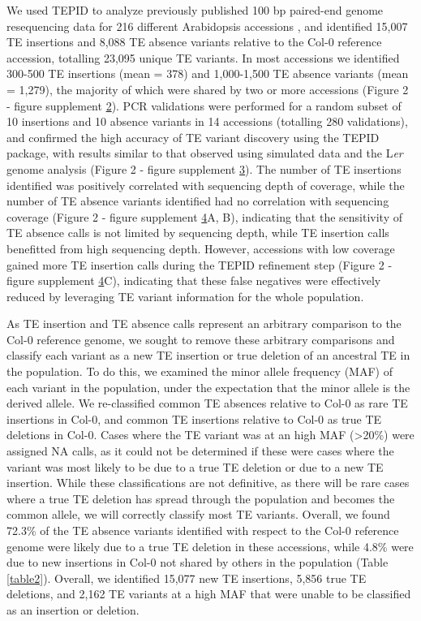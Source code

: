 \documentclass[12pt]{article}
\begin{document}
We used TEPID to analyze previously published 100 bp paired-end genome
resequencing data for 216 different Arabidopsis accessions
\cite{Schmitz:2013iu}, and identified 15,007 TE insertions and 8,088 TE
absence variants relative to the Col-0 reference accession, totalling
23,095 unique TE variants. In most accessions we identified 300-500 TE
insertions (mean = 378) and 1,000-1,500 TE absence variants (mean =
1,279), the majority of which were shared by two or more accessions
(Figure 2 - figure supplement \hyperref[fig2s2]{2}). PCR validations were performed for a
random subset of 10 insertions and 10 absence variants in 14 accessions
(totalling 280 validations), and confirmed the high accuracy of TE
variant discovery using the TEPID package, with results similar to that
observed using simulated data and the L\emph{er} genome analysis (Figure 2 -
figure supplement \hyperref[fig2s3]{3}). The number of TE insertions identified was
positively correlated with sequencing depth of coverage, while the
number of TE absence variants identified had no correlation with
sequencing coverage (Figure 2 - figure supplement \hyperref[fig2s4]{4}A, B), indicating
that the sensitivity of TE absence calls is not limited by sequencing
depth, while TE insertion calls benefitted from high sequencing depth.
However, accessions with low coverage gained more TE insertion calls
during the TEPID refinement step (Figure 2 - figure supplement \hyperref[fig2s4]{4}C),
indicating that these false negatives were effectively reduced by
leveraging TE variant information for the whole population.

As TE insertion and TE absence calls represent an arbitrary comparison
to the Col-0 reference genome, we sought to remove these arbitrary
comparisons and classify each variant as a new TE insertion or true
deletion of an ancestral TE in the population. To do this, we examined
the minor allele frequency (MAF) of each variant in the population,
under the expectation that the minor allele is the derived allele. We
re-classified common TE absences relative to Col-0 as rare TE insertions
in Col-0, and common TE insertions relative to Col-0 as true TE
deletions in Col-0. Cases where the TE variant was at an high MAF
(\textgreater{}20\%) were assigned NA calls, as it could not be
determined if these were cases where the variant was most likely to be
due to a true TE deletion or due to a new TE insertion. While these
classifications are not definitive, as there will be rare cases where a
true TE deletion has spread through the population and becomes the
common allele, we will correctly classify most TE variants. Overall, we
found 72.3\% of the TE absence variants identified with respect to the
Col-0 reference genome were likely due to a true TE deletion in these
accessions, while 4.8\% were due to new insertions in Col-0 not shared
by others in the population (Table \ref{table2}). Overall, we identified 15,077 new
TE insertions, 5,856 true TE deletions, and 2,162 TE variants at a high
MAF that were unable to be classified as an insertion or deletion.
\end{document}
